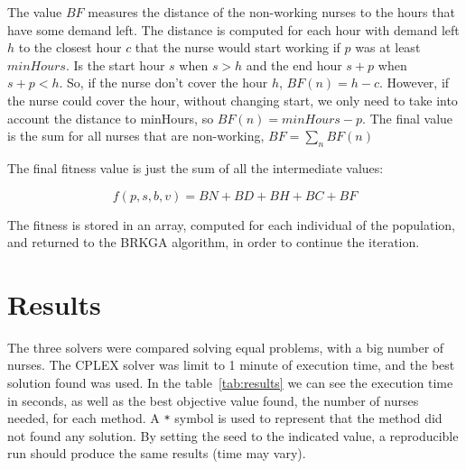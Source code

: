 \documentclass[12pt,a4paper]{article}
\begin{document}
The value $BF$ measures the distance of the non-working nurses to the hours that 
have some demand left. The distance is computed for each hour with demand left 
$h$ to the closest hour $c$ that the nurse would start working if $p$ was at 
least $minHours$. Is the start hour $s$ when $s > h$ and the end hour $s+p$ when 
$s+p < h$. So, if the nurse don't cover the hour $h$, $BF(n) = h - c$. However, 
if the nurse could cover the hour, without changing start, we only need to take 
into account the distance to minHours, so $BF(n) = minHours - p$. The final 
value is the sum for all nurses that are non-working, $BF = \sum_n BF(n)$

The final fitness value is just the sum of all the intermediate values:

$$ f(p,s,b,v) = BN + BD + BH + BC + BF $$

The fitness is stored in an array, computed for each individual of the 
population, and returned to the BRKGA algorithm, in order to continue the 
iteration.

\section{Results}

The three solvers were compared solving equal problems, with a big number of 
nurses. The CPLEX solver was limit to 1 minute of execution time, and the best 
solution found was used. In the table~\ref{tab:results} we can see the execution 
time in seconds, as well as the best objective value found, the number of nurses 
needed, for each method. A \texttt{*} symbol is used to represent that the 
method did not found any solution. By setting the seed to the indicated value, a 
reproducible run should produce the same results (time may vary).
\end{document}
